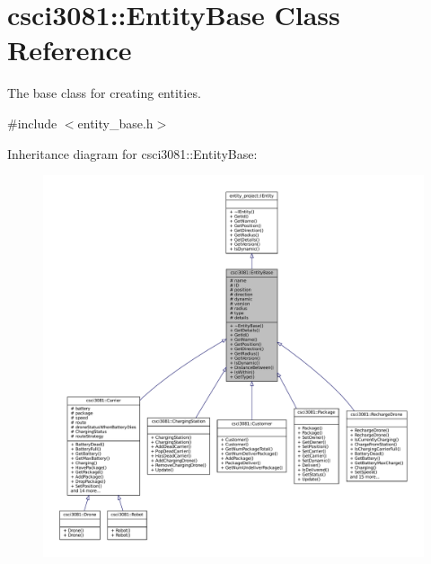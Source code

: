 \hypertarget{classcsci3081_1_1EntityBase}{}\section{csci3081\+:\+:Entity\+Base Class Reference}
\label{classcsci3081_1_1EntityBase}


The base class for creating entities.  




{\ttfamily \#include $<$entity\+\_\+base.\+h$>$}



Inheritance diagram for csci3081\+:\+:Entity\+Base\+:
\nopagebreak
\begin{figure}[H]
\begin{center}
\leavevmode
\includegraphics[width=350pt]{classcsci3081_1_1EntityBase__inherit__graph}
\end{center}
\end{figure}
